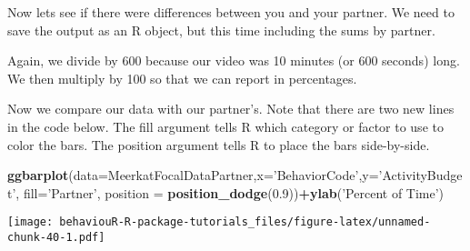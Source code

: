 \documentclass[]{book}
\newenvironment{Shaded}{\begin{snugshade}}{\end{snugshade}}
\newcommand{\DataTypeTok}[1]{\textcolor[rgb]{0.13,0.29,0.53}{#1}}
\newcommand{\DecValTok}[1]{\textcolor[rgb]{0.00,0.00,0.81}{#1}}
\newcommand{\FloatTok}[1]{\textcolor[rgb]{0.00,0.00,0.81}{#1}}
\newcommand{\KeywordTok}[1]{\textcolor[rgb]{0.13,0.29,0.53}{\textbf{#1}}}
\newcommand{\NormalTok}[1]{#1}
\newcommand{\OperatorTok}[1]{\textcolor[rgb]{0.81,0.36,0.00}{\textbf{#1}}}
\newcommand{\StringTok}[1]{\textcolor[rgb]{0.31,0.60,0.02}{#1}}
\begin{document}
Now lets see if there were differences between you and your partner. We need to save the output as an R object, but this time including the sums by partner.

\begin{Shaded}
\end{Shaded}

Again, we divide by 600 because our video was 10 minutes (or 600 seconds) long. We then multiply by 100 so that we can report in percentages.

\begin{Shaded}
\end{Shaded}

Now we compare our data with our partner's. Note that there are two new lines in the code below. The fill argument tells R which category or factor to use to color the bars. The position argument tells R to place the bars side-by-side.

\begin{Shaded}
\begin{Highlighting}[]
\KeywordTok{ggbarplot}\NormalTok{(}\DataTypeTok{data=}\NormalTok{MeerkatFocalDataPartner,}\DataTypeTok{x=}\StringTok{'BehaviorCode'}\NormalTok{,}\DataTypeTok{y=}\StringTok{'ActivityBudget'}\NormalTok{, }\DataTypeTok{fill=}\StringTok{'Partner'}\NormalTok{,}
          \DataTypeTok{position =} \KeywordTok{position_dodge}\NormalTok{(}\FloatTok{0.9}\NormalTok{))}\OperatorTok{+}\KeywordTok{ylab}\NormalTok{(}\StringTok{'Percent of Time'}\NormalTok{)}
\end{Highlighting}
\end{Shaded}

\texttt{[image: behaviouR-R-package-tutorials\_files/figure-latex/unnamed-chunk-40-1.pdf]}
\end{document}
